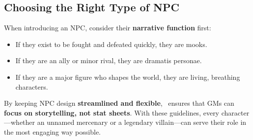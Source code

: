 \subsection{Choosing the Right Type of NPC}

When introducing an NPC, consider their \textbf{narrative function} first:
\begin{itemize}
    \item If they exist to be fought and defeated quickly, they are mooks.
    \item If they are an ally or minor rival, they are dramatis personae.
    \item If they are a major figure who shapes the world, they are living, breathing characters.
\end{itemize}

By keeping NPC design \textbf{streamlined and flexible}, \wyrd\ ensures that GMs can \textbf{focus on storytelling, not stat sheets}. With these guidelines, every character—whether an unnamed mercenary or a legendary villain—can serve their role in the most engaging way possible.

